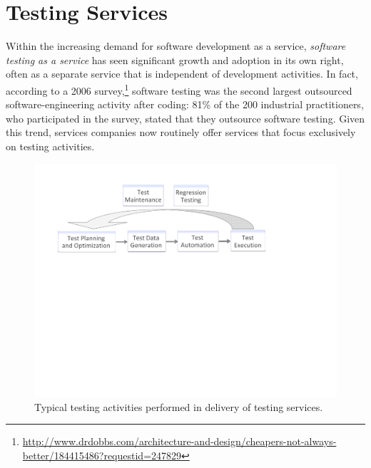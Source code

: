 
\section{Testing Services}
\label{sec:testing-debugging}

Within the increasing demand for software development as a service,
\textit{software testing as a service} has seen significant growth and adoption
in its own right, often as a separate service that is independent of development
activities. In fact, according to a 2006 survey,\footnote{\scriptsize
  \url{http://www.drdobbs.com/architecture-and-design/cheapers-not-always-better/184415486?requestid=247829}}
software testing was the second largest outsourced software-engineering activity
after coding: 81\% of the 200 industrial practitioners, who participated in the
survey, stated that they outsource software testing. Given this trend, services
companies now routinely offer services that focus exclusively on testing
activities.


\begin{figure}[t]
\centering
\includegraphics[width=\columnwidth, clip, trim = 22mm 133mm 65mm
  17mm]{figs/testing-activities.pdf}
\vspace*{-15pt}
\caption{Typical testing activities performed in delivery of testing services.}
\vspace*{-10pt}
\label{fig:testing-activities}
\end{figure}

